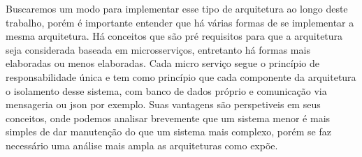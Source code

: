 Buscaremos um modo para implementar esse tipo de arquitetura ao longo deste trabalho, porém é importante entender que há várias formas de se implementar a mesma arquitetura. Há conceitos que são pré requisitos para que a arquitetura seja considerada baseada em microsserviços, entretanto há formas mais elaboradas ou menos elaboradas. Cada micro serviço segue o princípio de responsabilidade única e tem como princípio que cada componente da arquitetura o isolamento desse sistema, com banco de dados próprio e comunicação via mensageria ou json por exemplo. Suas vantagens são perspetiveis em seus conceitos, onde podemos analisar brevemente que um sistema menor é mais simples de dar manutenção do que um sistema mais complexo, porém se faz necessário uma análise mais ampla as arquiteturas como \cite{Richards2015} expõe.



